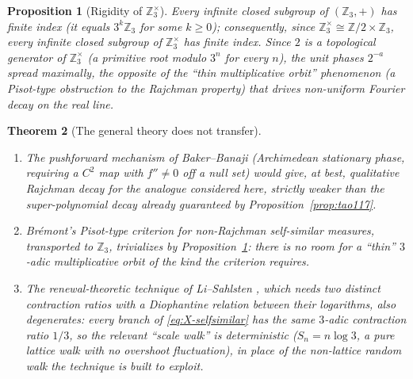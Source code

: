 \documentclass[11pt]{article}
\newtheorem{theorem}{Theorem}[section]
\newtheorem{proposition}[theorem]{Proposition}
\theoremstyle{definition}
\theoremstyle{remark}
\begin{document}
\begin{proposition}[Rigidity of $\mathbb{Z}_3^\times$]\label{prop:rigidity}
Every infinite closed subgroup of $(\mathbb{Z}_3,+)$ has finite index
(it equals $3^k\mathbb{Z}_3$ for some $k\ge 0$); consequently, since
$\mathbb{Z}_3^\times\cong\mathbb{Z}/2\times\mathbb{Z}_3$, every
infinite closed subgroup of $\mathbb{Z}_3^\times$ has finite index.
Since $2$ is a topological generator of $\mathbb{Z}_3^\times$ (a
primitive root modulo $3^n$ for every $n$), the unit phases
$2^{-a}$ spread maximally, the opposite of the ``thin multiplicative
orbit'' phenomenon (a Pisot-type obstruction to the Rajchman property)
that drives non-uniform Fourier decay on the real line.
\end{proposition}

\begin{theorem}[The general theory does not transfer]\label{thm:no-transfer}
\begin{enumerate}[label=(\alph*)]
\item The pushforward mechanism of Baker--Banaji
  \cite{BakerBanaji2026} (Archimedean stationary phase, requiring a
  $C^2$ map with $f''\ne 0$ off a null set) would give, at best,
  \emph{qualitative} Rajchman decay for the analogue considered here,
  strictly weaker than the super-polynomial decay already
  guaranteed by Proposition~\ref{prop:tao117}.
\item Brémont's Pisot-type criterion for non-Rajchman self-similar
  measures, transported to $\mathbb{Z}_3$, trivializes by
  Proposition~\ref{prop:rigidity}: there is no room for a
  ``thin'' $3$-adic multiplicative orbit of the kind the criterion
  requires.
\item The renewal-theoretic technique of Li--Sahlsten
  \cite{LiSahlsten2022}, which needs \emph{two distinct} contraction
  ratios with a Diophantine relation between their logarithms, also
  degenerates: every branch of \eqref{eq:X-selfsimilar} has the
  \emph{same} $3$-adic contraction ratio $1/3$, so the relevant
  ``scale walk'' is deterministic ($S_n = n\log 3$, a pure lattice
  walk with no overshoot fluctuation), in place of the non-lattice
  random walk the technique is built to exploit.
\end{enumerate}
\end{theorem}
\end{document}
